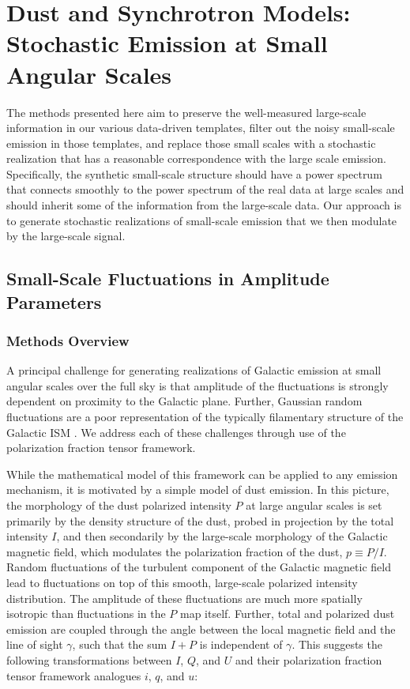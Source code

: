 \documentclass[twocolumn]{aastex631}
\begin{document}
\section{Dust and Synchrotron Models: Stochastic Emission at Small Angular Scales} \label{sec:small_scales}
The methods presented here aim to preserve the well-measured large-scale information in our various data-driven templates, filter out the noisy small-scale emission in those templates, and replace those small scales with a stochastic realization that has a reasonable correspondence with the large scale emission. Specifically, the synthetic small-scale structure should have a power spectrum that connects smoothly to the power spectrum of the real data at large scales and should inherit some of the information from the large-scale data. Our approach is to generate stochastic realizations of small-scale emission that we then modulate by the large-scale signal.

\subsection{Small-Scale Fluctuations in Amplitude Parameters}

\subsubsection{Methods Overview}\label{subsec:methodology}
A principal challenge for generating realizations of Galactic emission at small angular scales over the full sky is that amplitude of the fluctuations is strongly dependent on proximity to the Galactic plane. Further, Gaussian random fluctuations are a poor representation of the typically filamentary structure of the Galactic ISM \citep[e.g.,][]{Hacar:2023}. We address each of these challenges through use of the polarization fraction tensor framework.

While the mathematical model of this framework can be applied to any emission mechanism, it is motivated by a simple model of dust emission. In this picture, the morphology of the dust polarized intensity $P$ at large angular scales is set primarily by the density structure of the dust, probed in projection by the total intensity $I$, and then secondarily by the large-scale morphology of the Galactic magnetic field, which modulates the polarization fraction of the dust, $p \equiv P/I$. Random fluctuations of the turbulent component of the Galactic magnetic field lead to fluctuations on top of this smooth, large-scale polarized intensity distribution. The amplitude of these fluctuations are much more spatially isotropic than fluctuations in the $P$ map itself. Further, total and polarized dust emission are coupled through the angle between the local magnetic field and the line of sight $\gamma$, such that the sum $I+P$ is independent of $\gamma$. This suggests the following transformations between $I$, $Q$, and $U$ and their polarization fraction tensor framework analogues $i$, $q$, and $u$:
\end{document}

